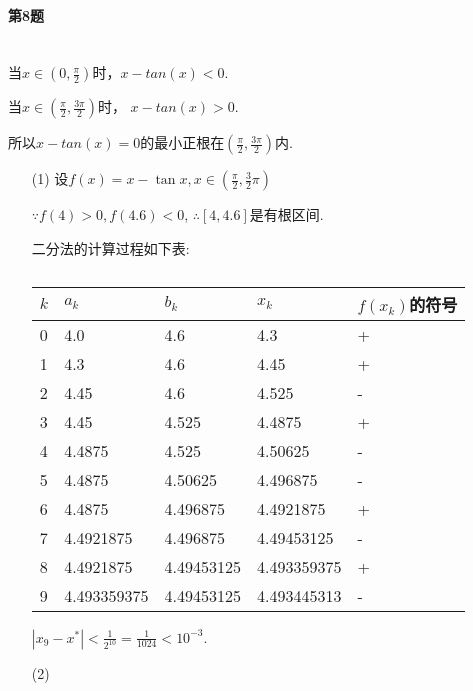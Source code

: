 \documentclass[a4paper]{article}
\begin{document}
\paragraph{第8题}~{}
\\

当$x \in\left(0, \frac{\pi}{2}\right)$时，$x - tan(x) < 0$. \par
当$x \in \left(\frac{\pi}{2}, \frac{3 \pi}{2}\right)$时， $x - tan(x) > 0$. \par
所以$x - tan(x) = 0$的最小正根在$\left(\frac{\pi}{2}, \frac{3 \pi}{2}\right)$内.\par
\begin{enumerate}
    \item [(1)]
    设$f(x)=x-\tan x, x \in\left(\frac{\pi}{2}, \frac{3}{2} \pi\right)$\par
    $\because f(4) > 0, f(4.6) < 0$, $\therefore [4, 4.6]$是有根区间. \par
    二分法的计算过程如下表: \par
    \begin{table}[h]
        \centering
        \caption{}
        \label{tab:my-table}
        \begin{tabular}{lllll}
        \hline
        $k$ & $a_k$ & $b_k$ & $x_k$ & $f(x_k)$的符号  \\ \hline
        0 &   4.0    & 4.6  & 4.3 &   + \\
        1 &   4.3  & 4.6  & 4.45 &  +  \\
        2 &   4.45  & 4.6 & 4.525 &  -  \\
        3 &   4.45  & 4.525 & 4.4875 & +   \\
        4 &   4.4875  & 4.525 & 4.50625 & -   \\
        5 &   4.4875  & 4.50625 & 4.496875 & -   \\
        6 &   4.4875  & 4.496875 & 4.4921875 & +   \\
        7 &   4.4921875  & 4.496875 & 4.49453125 & -   \\
        8 &   4.4921875  & 4.49453125 & 4.493359375 & +   \\
        9 &   4.493359375  & 4.49453125 & 4.493445313 & -   \\
        \hline 
        \end{tabular}
        \end{table} \par
    $\left|x_{9}-x^{*}\right|<\frac{1}{2^{10}}=\frac{1}{1024}<10^{-3}$.\par
    \item [(2)]

\end{enumerate}
\end{document}
